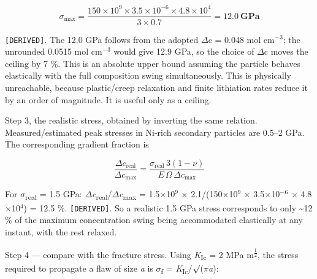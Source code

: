\documentclass[11pt,a4paper]{article}
\begin{document}
\begin{equation}\sigma_{\max} = \frac{150\times10^{9}\times3.5\times10^{-6}\times4.8\times10^{4}}{3\times0.7} = \mathbf{12.0\ GPa} \tag{S2.23}\end{equation}


\texttt{[DERIVED]}. The 12.0 GPa follows from the adopted \ensuremath{\Delta}c = 0.048 mol cm\ensuremath{^{-}}\ensuremath{^{3}}; the unrounded 0.0515 mol cm\ensuremath{^{-}}\ensuremath{^{3}} would give 12.9 GPa, so the choice of \ensuremath{\Delta}c moves the ceiling by 7 \%. This is an absolute upper bound assuming the particle behaves elastically with the full composition swing simultaneously. This is physically unreachable, because plastic/creep relaxation and finite lithiation rates reduce it by an order of magnitude. It is useful only as a ceiling.


Step 3, the realistic stress, obtained by inverting the same relation. Measured/estimated peak stresses in Ni-rich secondary particles are 0.5--2 GPa. The corresponding gradient fraction is


\begin{equation}\frac{\Delta c_{\text{real}}}{\Delta c_{\max}} = \frac{\sigma_{\text{real}}\,3(1-\nu)}{E\,\Omega\,\Delta c_{\max}} \nonumber\end{equation}


For \ensuremath{\sigma}\textsubscript{real} = 1.5 GPa: \ensuremath{\Delta}\emph{c}\textsubscript{real}/\ensuremath{\Delta}\emph{c}\textsubscript{max} = 1.5\ensuremath{\times}10\ensuremath{^{9}} \ensuremath{\times} 2.1/(150\ensuremath{\times}10\ensuremath{^{9}} \ensuremath{\times} 3.5\ensuremath{\times}10\ensuremath{^{-}}\ensuremath{^{6}} \ensuremath{\times} 4.8\ensuremath{\times}10\ensuremath{^{4}}) = 12.5 \%. \texttt{[DERIVED]}. So a realistic 1.5 GPa stress corresponds to only \textasciitilde{}12 \% of the maximum concentration swing being accommodated elastically at any instant, with the rest relaxed.


Step 4 --- compare with the fracture stress. Using \emph{K}\textsubscript{Ic} = 2 MPa m\textsuperscript{\ensuremath{\tfrac{1}{2}}}, the stress required to propagate a flaw of size \emph{a} is \ensuremath{\sigma}\textsubscript{f} = \emph{K}\textsubscript{Ic}/\ensuremath{\surd}(\ensuremath{\pi}\emph{a}):
\end{document}
